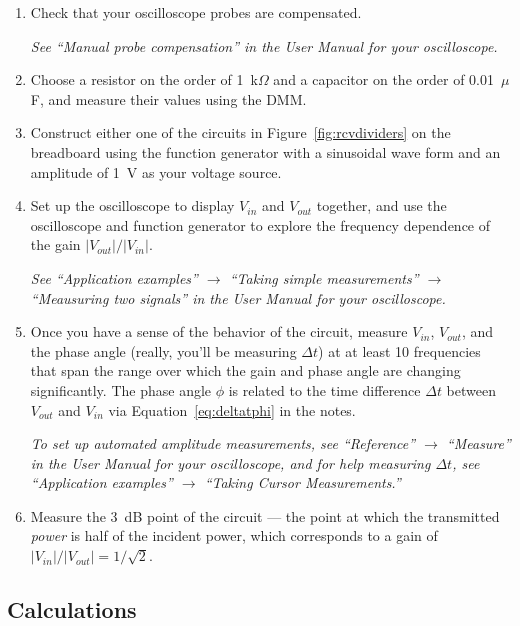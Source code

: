 \documentclass[11pt]{article}
\begin{document}
\begin{enumerate}
\item Check that your oscilloscope probes are compensated.

  \emph{See ``Manual probe compensation'' in the User Manual for
    your oscilloscope.}

\item Choose a resistor on the order of 1~k$\Omega$ and a capacitor on
  the order of 0.01~$\mu$F, and measure their values using the DMM.  

\item Construct either one of the circuits in
  Figure~\ref{fig:rcvdividers} on the breadboard using the function
  generator with a sinusoidal wave form and an amplitude of 1~V as
  your voltage source.

\item Set up the oscilloscope to display $V_{in}$ and $V_{out}$
  together, and use the oscilloscope and function generator to explore
  the frequency dependence of the gain $|V_{out}|/|V_{in}|$. 

  \emph{See ``Application examples'' $\rightarrow$ ``Taking simple
    measurements'' $\rightarrow$ ``Meausuring two signals'' in the
    User Manual for your oscilloscope.}

\item Once you have a sense of the behavior of the circuit, measure
  $V_{in}$, $V_{out}$, and the phase angle (really, you'll be
  measuring $\Delta t$) at at least 10 frequencies that span the range
  over which the gain and phase angle are changing significantly.
  The phase angle $\phi$ is related to the time difference $\Delta t$
  between $V_{out}$ and $V_{in}$ via Equation~\ref{eq:deltatphi} in
  the notes. 

  \emph{To set up automated amplitude measurements, see ``Reference''
    $\rightarrow$ ``Measure'' in the User Manual for your
    oscilloscope, and for help measuring $\Delta t$, see ``Application
    examples'' $\rightarrow$ ``Taking Cursor Measurements.''}

\item Measure the 3~dB point of the circuit --- the point at
  which the transmitted \emph{power} is half of the
  incident power, which corresponds to a gain of $|V_{in}|/|V_{out}| =
  1/\sqrt{2}$.
\end{enumerate}

\subsection*{Calculations}
\end{document}
